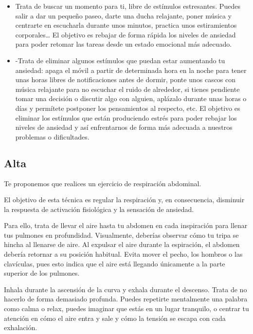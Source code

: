                 \begin{itemize}
                    \item Trata de buscar un momento para ti, libre de estímulos estresantes. Puedes salir a dar un 
                    pequeño paseo, darte una ducha relajante, poner música y centrarte en escucharla durante unos 
                    minutos, practica unos estiramientos corporales… El objetivo es rebajar de forma rápida los 
                    niveles de ansiedad para poder retomar las tareas desde un estado emocional más adecuado. 
                    \item -Trata de eliminar algunos estímulos que puedan estar aumentando tu ansiedad: apaga el 
                    móvil a partir de determinada hora en la noche para tener unas horas libres de notificaciones 
                    antes de dormir, ponte unos cascos con música relajante para no escuchar el ruido de alrededor, 
                    si tienes pendiente tomar una decisión o discutir algo con alguien, aplázalo durante unas horas 
                    o días y permítete postponer los pensamientos al respecto, etc. El objetivo es eliminar los 
                    estímulos que están produciendo estrés para poder rebajar los niveles de ansiedad y así 
                    enfrentarnos de forma más adecuada a nuestros problemas o dificultades. 
                \end{itemize}
        \subsection{Alta}
            Te proponemos que realices un ejercicio de respiración abdominal. 

            El objetivo de esta técnica es regular la respiración y, en consecuencia, disminuir la respuesta de 
            activación fisiológica y la sensación de ansiedad. 
            
            Para ello, trata de llevar el aire hasta tu abdomen en cada inspiración para llenar tus pulmones en 
            profundidad. Visualmente, deberías observar cómo tu tripa se hincha al llenarse de aire. Al expulsar 
            el aire durante la espiración, el abdomen debería retornar a su posición habitual. Evita mover el pecho, 
            los hombros o las clavículas, pues esto indica que el aire está llegando únicamente a la parte superior 
            de los pulmones.
            
            Inhala durante la ascensión de la curva y exhala durante el descenso. Trata de no hacerlo de forma 
            demasiado profunda. Puedes repetirte mentalmente una palabra como calma o relax, puedes imaginar que 
            estás en un lugar tranquilo, o centrar tu atención en cómo el aire entra y sale y cómo la tensión se 
            escapa con cada exhalación. 
    
